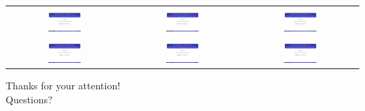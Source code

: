 \documentclass{beamer}
\begin{document}
\begin{frame}
\begin{tabular}{ccc}
\includegraphics[page=9, width=0.3\textwidth]{ali.pdf} &
\includegraphics[page=12, width=0.3\textwidth]{ali.pdf} &
\includegraphics[page=13, width=0.3\textwidth]{ali.pdf} \\

\includegraphics[page=18, width=0.3\textwidth]{ali.pdf} &
\includegraphics[page=22, width=0.3\textwidth]{ali.pdf} &
\includegraphics[page=25, width=0.3\textwidth]{ali.pdf} \\




\end{tabular}

\begin{block}{}
\centering Thanks for your attention!\\
Questions?
\end{block}
\end{frame}
\end{document}
